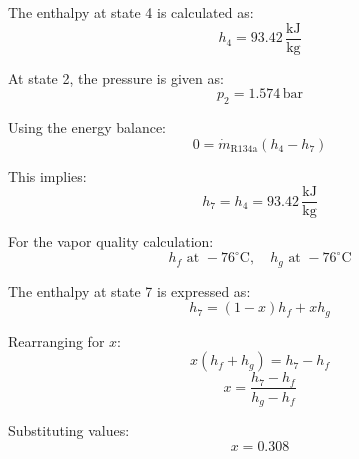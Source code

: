 The enthalpy at state 4 is calculated as:  
\[
h_4 = 93.42 \, \frac{\text{kJ}}{\text{kg}}
\]

At state 2, the pressure is given as:  
\[
p_2 = 1.574 \, \text{bar}
\]

Using the energy balance:  
\[
0 = \dot{m}_{\text{R134a}} (h_4 - h_7)
\]

This implies:  
\[
h_7 = h_4 = 93.42 \, \frac{\text{kJ}}{\text{kg}}
\]

For the vapor quality calculation:  
\[
h_f \text{ at } -76^\circ\text{C}, \quad h_g \text{ at } -76^\circ\text{C}
\]

The enthalpy at state 7 is expressed as:  
\[
h_7 = (1 - x) h_f + x h_g
\]

Rearranging for \( x \):  
\[
x (h_f + h_g) = h_7 - h_f
\]
\[
x = \frac{h_7 - h_f}{h_g - h_f}
\]

Substituting values:  
\[
x = 0.308
\]